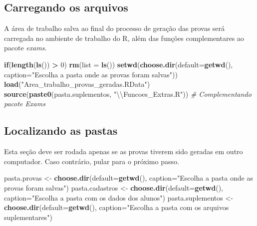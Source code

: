 \documentclass[a4paper]{report}
\newenvironment{Shaded}{\begin{snugshade}}{\end{snugshade}}
\newcommand{\KeywordTok}[1]{\textcolor[rgb]{0.13,0.29,0.53}{\textbf{#1}}}
\newcommand{\DataTypeTok}[1]{\textcolor[rgb]{0.13,0.29,0.53}{#1}}
\newcommand{\DecValTok}[1]{\textcolor[rgb]{0.00,0.00,0.81}{#1}}
\newcommand{\CharTok}[1]{\textcolor[rgb]{0.31,0.60,0.02}{#1}}
\newcommand{\StringTok}[1]{\textcolor[rgb]{0.31,0.60,0.02}{#1}}
\newcommand{\CommentTok}[1]{\textcolor[rgb]{0.56,0.35,0.01}{\textit{#1}}}
\newcommand{\ControlFlowTok}[1]{\textcolor[rgb]{0.13,0.29,0.53}{\textbf{#1}}}
\newcommand{\OperatorTok}[1]{\textcolor[rgb]{0.81,0.36,0.00}{\textbf{#1}}}
\newcommand{\NormalTok}[1]{#1}
\begin{document}
\subsection{Carregando os arquivos}

A área de trabalho salva ao final do processo de geração das provas será
carregada no ambiente de trabalho do R, além das funções complementares
ao pacote \emph{exams}.

\begin{Shaded}
\begin{Highlighting}[]
\ControlFlowTok{if}\NormalTok{(}\KeywordTok{length}\NormalTok{(}\KeywordTok{ls}\NormalTok{()) }\OperatorTok{>}\StringTok{ }\DecValTok{0}\NormalTok{) }\KeywordTok{rm}\NormalTok{(}\DataTypeTok{list =} \KeywordTok{ls}\NormalTok{())}
\KeywordTok{setwd}\NormalTok{(}\KeywordTok{choose.dir}\NormalTok{(}\DataTypeTok{default=}\KeywordTok{getwd}\NormalTok{(), }\DataTypeTok{caption=}\StringTok{"Escolha a pasta onde as provas foram salvas"}\NormalTok{))}
\KeywordTok{load}\NormalTok{(}\StringTok{"Area_trabalho_provas_geradas.RData"}\NormalTok{)}
\KeywordTok{source}\NormalTok{(}\KeywordTok{paste0}\NormalTok{(pasta.suplementos, }\StringTok{"}\CharTok{\textbackslash{}\textbackslash{}}\StringTok{Funcoes_Extras.R"}\NormalTok{))  }\CommentTok{# Complementando pacote Exams }
\end{Highlighting}
\end{Shaded}

\subsection{Localizando as pastas}

Esta seção deve ser rodada apenas se as provas tiverem sido geradas em
outro computador. Caso contrário, pular para o próximo passo.

\begin{Shaded}
\begin{Highlighting}[]
\NormalTok{pasta.provas <-}\StringTok{ }\KeywordTok{choose.dir}\NormalTok{(}\DataTypeTok{default=}\KeywordTok{getwd}\NormalTok{(), }
                           \DataTypeTok{caption=}\StringTok{"Escolha a pasta onde as provas foram salvas"}\NormalTok{)}
\NormalTok{pasta.cadastros <-}\StringTok{ }\KeywordTok{choose.dir}\NormalTok{(}\DataTypeTok{default=}\KeywordTok{getwd}\NormalTok{(), }
                              \DataTypeTok{caption=}\StringTok{"Escolha a pasta com os dados dos alunos"}\NormalTok{)}
\NormalTok{pasta.suplementos <-}\StringTok{ }\KeywordTok{choose.dir}\NormalTok{(}\DataTypeTok{default=}\KeywordTok{getwd}\NormalTok{(), }
                            \DataTypeTok{caption=}\StringTok{"Escolha a pasta com os arquivos suplementares"}\NormalTok{)}
\end{Highlighting}
\end{Shaded}
\end{document}
